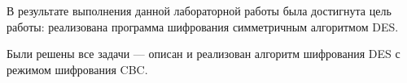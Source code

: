 \Conclusion %

В результате выполнения данной лабораторной работы была достигнута цель работы:  реализована программа шифрования симметричным алгоритмом DES.

Были решены все задачи --- описан и реализован алгоритм шифрования DES с режимом шифрования CBC.
